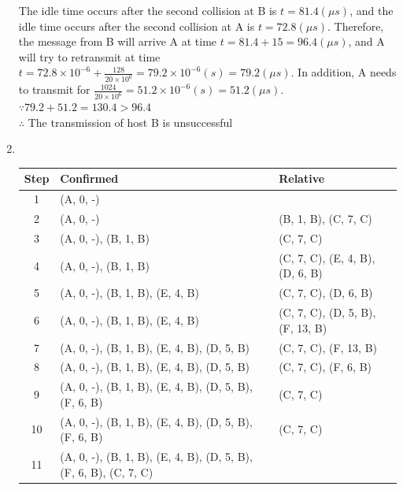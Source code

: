\documentclass[10pt, a4paper]{article}
\begin{document}
\begin{enumerate}
        The idle time occurs after the second collision at B is $t = 81.4 (\mu s)$, and the idle time occurs after the second collision at A is $t = 72.8 (\mu s)$. Therefore, the message from B will arrive A at time $t = 81.4 + 15 = 96.4 (\mu s)$, and A will try to retransmit at time $t = 72.8 \times 10^{-6} + \frac{128}{20 \times 10^6} = 79.2 \times 10^{-6} (s) = 79.2 (\mu s)$. In addition, A needs to transmit for $\frac{1024}{20 \times 10^6} = 51.2 \times 10^{-6} (s) = 51.2 (\mu s)$.\\
        $\because 79.2 + 51.2 = 130.4 > 96.4$\\
        $\therefore$ The transmission of host B is unsuccessful

\item\mbox{}\\
    \begin{tabular}{cll}
        \toprule
        Step & Confirmed & Relative\\
        \hline
        1 & (A, 0, -) & \\
        2 & (A, 0, -) & (B, 1, B), (C, 7, C)\\
        3 & (A, 0, -), (B, 1, B) & (C, 7, C)\\
        4 & (A, 0, -), (B, 1, B) & (C, 7, C), (E, 4, B), (D, 6, B)\\
        5 & (A, 0, -), (B, 1, B), (E, 4, B) & (C, 7, C), (D, 6, B)\\
        6 & (A, 0, -), (B, 1, B), (E, 4, B) & (C, 7, C), (D, 5, B), (F, 13, B)\\
        7 & (A, 0, -), (B, 1, B), (E, 4, B), (D, 5, B) & (C, 7, C), (F, 13, B)\\
        8 & (A, 0, -), (B, 1, B), (E, 4, B), (D, 5, B) & (C, 7, C), (F, 6, B)\\
        9 & (A, 0, -), (B, 1, B), (E, 4, B), (D, 5, B), (F, 6, B) & (C, 7, C)\\
        10 & (A, 0, -), (B, 1, B), (E, 4, B), (D, 5, B), (F, 6, B) & (C, 7, C)\\
        11 & (A, 0, -), (B, 1, B), (E, 4, B), (D, 5, B), (F, 6, B), (C, 7, C) & \\
        \bottomrule
    \end{tabular}
\end{enumerate}
\end{document}
